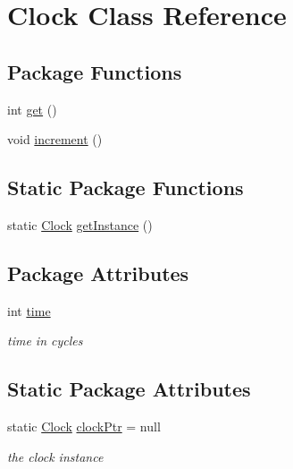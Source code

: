 \hypertarget{classClock}{\section{\-Clock \-Class \-Reference}
\label{classClock}
}
\subsection*{\-Package \-Functions}
\begin{DoxyCompactItemize}
\item 
int \hyperlink{classClock_abe7c66449e7a155e0282fa6d7729e6c4}{get} ()
\item 
void \hyperlink{classClock_acac4aeac51e5810dc69f1db7117ba3b5}{increment} ()
\end{DoxyCompactItemize}
\subsection*{\-Static \-Package \-Functions}
\begin{DoxyCompactItemize}
\item 
static \hyperlink{classClock}{\-Clock} \hyperlink{classClock_ad31ad1bcc6dcab94983793945f93aa54}{get\-Instance} ()
\end{DoxyCompactItemize}
\subsection*{\-Package \-Attributes}
\begin{DoxyCompactItemize}
\item 
int \hyperlink{classClock_a41bc3b4f0629b2c79c958603ebc84d2a}{time}
\begin{DoxyCompactList}\small\item\em time in cycles \end{DoxyCompactList}\end{DoxyCompactItemize}
\subsection*{\-Static \-Package \-Attributes}
\begin{DoxyCompactItemize}
\item 
static \hyperlink{classClock}{\-Clock} \hyperlink{classClock_a87cca74ba80805514591a3761b156e60}{clock\-Ptr} = null
\begin{DoxyCompactList}\small\item\em the clock instance \end{DoxyCompactList}\end{DoxyCompactItemize}
